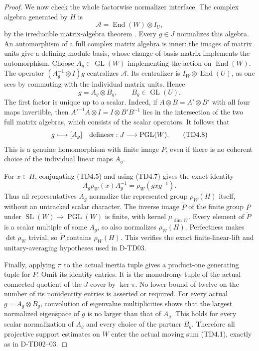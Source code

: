 \begin{proof}
We now check the whole factorwise normalizer interface.  The complex
algebra generated by $H$ is
\[
             \mathcal A=\operatorname{End}(W)\otimes I_U,
             \tag{TD4.6}
\]
by the irreducible matrix-algebra theorem
\cite[\S6.2, Proposition~10]{OG:Serre1977}.
Every $g\in J$ normalizes this algebra.  An automorphism of a full
complex matrix algebra is inner: the images of matrix units give
a defining module basis, whose change-of-basis matrix implements
the automorphism.  Choose $A_g\in\operatorname{GL}(W)$ implementing
the action on $\operatorname{End}(W)$.  The operator
$(A_g^{-1}\otimes I)g$ centralizes $\mathcal A$.  Its centralizer
is $I_W\otimes\operatorname{End}(U)$, as one sees by commuting
with the individual matrix units.  Hence
\[
                        g=A_g\otimes B_g,
                        \qquad B_g\in\operatorname{GL}(U).
                        \tag{TD4.7}
\]
The first factor is unique up to a scalar.  Indeed, if
$A\otimes B=A'\otimes B'$ with all four maps invertible,
then $A'^{-1}A\otimes I=I\otimes B'B^{-1}$ lies in the
intersection of the two full matrix algebras, which consists
of the scalar operators.  It follows that
\[
                  g\longmapsto[A_g]\quad\hbox{defines}
                  \pi:J\longrightarrow\operatorname{PGL}(W).
                  \tag{TD4.8}
\]
This is a genuine homomorphism with finite image $P$, even if
there is no coherent choice of the individual linear maps $A_g$.

For $x\in H$, conjugating (TD4.5) and using (TD4.7) gives the
exact identity
\[
          A_g\rho_W(x)A_g^{-1}=\rho_W(gxg^{-1}).
          \tag{TD4.9}
\]
Thus all representatives $A_g$ normalize the represented group
$\rho_W(H)$ itself, without an untracked scalar character.
The inverse image $\widetilde P$ of the finite group $P$ under
$\operatorname{SL}(W)\to\operatorname{PGL}(W)$ is finite, with
kernel $\mu_{\dim W}$.  Every element of $\widetilde P$ is a
scalar multiple of some $A_g$, so also normalizes $\rho_W(H)$.
Perfectness makes $\det\rho_W$ trivial, so $\widetilde P$
contains $\rho_W(H)$.  This verifies the exact finite-linear-lift
and unitary-averaging hypotheses used in D-TD03.

Finally, applying $\pi$ to the actual inertia tuple gives a
product-one generating tuple for $P$.  Omit its identity entries.
It is the monodromy tuple of the actual connected quotient of
the $J$-cover by $\ker\pi$.  No lower bound of twelve on the
number of its nonidentity entries is asserted or required.
For every actual $g=A_g\otimes B_g$, convolution of eigenvalue
multiplicities shows that the largest normalized eigenspace of
$g$ is no larger than that of $A_g$.  This holds for every scalar
normalization of $A_g$ and every choice of the partner $B_g$.
Therefore all projective support estimates on $W$ enter the
actual moving sum (TD4.1), exactly as in D-TD02--03.


\end{proof}
